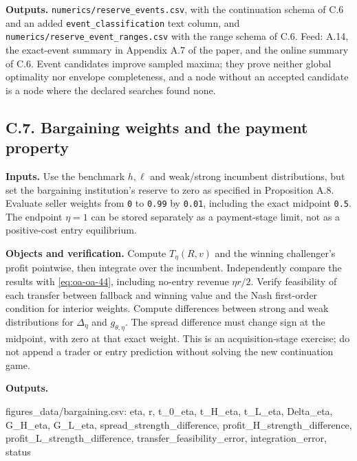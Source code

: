 \documentclass[
  11pt,
]{article}
\newenvironment{Shaded}{}{}
\newcommand{\NormalTok}[1]{#1}
\newcounter{none} %
\begin{document}
\textbf{Outputs.} \texttt{numerics/reserve\_events.csv}, with the
continuation schema of C.6 and an added \texttt{event\_classification}
text column, and \texttt{numerics/reserve\_event\_ranges.csv} with the
range schema of C.6. Feed: A.14, the exact-event summary in Appendix A.7
of the paper, and the online summary of C.6. Event candidates improve sampled
maxima; they prove neither global optimality nor envelope completeness,
and a node without an accepted candidate is a node where the declared
searches found none.

\subsection{C.7. Bargaining weights and the payment
property}\label{oa-c-bargaining}

\textbf{Inputs.} Use the benchmark \(h,\ell\) and weak/strong incumbent
distributions, but set the bargaining institution's reserve to zero as
specified in Proposition A.8. Evaluate seller weights from \texttt{0} to
\texttt{0.99} by \texttt{0.01}, including the exact midpoint
\texttt{0.5}. The endpoint \(\eta=1\) can be stored separately as a
payment-stage limit, not as a positive-cost entry equilibrium.

\textbf{Objects and verification.} Compute \(T_\eta(R,v)\) and the
winning challenger's profit pointwise, then integrate over the
incumbent. Independently compare the results with \eqref{eq:oa-oa-44},
including no-entry revenue \(\eta r/2\). Verify feasibility of each
transfer between fallback and winning value and the Nash first-order
condition for interior weights. Compute differences between strong and
weak distributions for \(\Delta_\eta\) and \(g_{\theta,\eta}\). The
spread difference must change sign at the midpoint, with zero at that
exact weight. This is an acquisition-stage exercise; do not append a
trader or entry prediction without solving the new continuation game.

\textbf{Outputs.}

\begin{Shaded}
\begin{Highlighting}[]
\NormalTok{figures\_data/bargaining.csv:}
\NormalTok{eta, r, t\_0\_eta, t\_H\_eta, t\_L\_eta, Delta\_eta,}
\NormalTok{G\_H\_eta, G\_L\_eta, spread\_strength\_difference,}
\NormalTok{profit\_H\_strength\_difference, profit\_L\_strength\_difference,}
\NormalTok{transfer\_feasibility\_error, integration\_error, status}
\end{Highlighting}
\end{Shaded}
\end{document}
